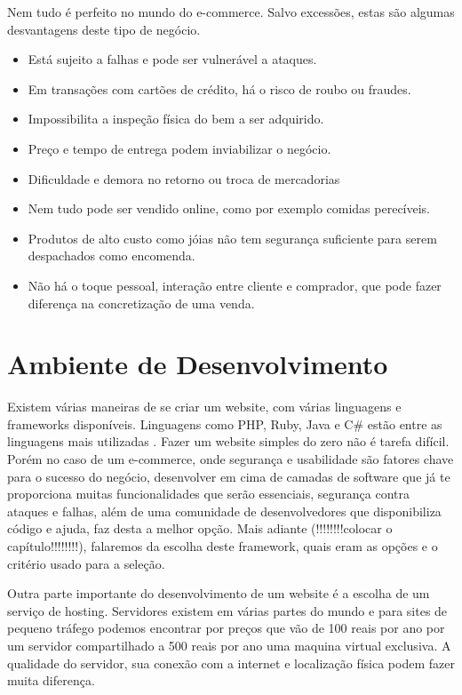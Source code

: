 Nem tudo é perfeito no mundo do e-commerce. Salvo excessões, estas são algumas desvantagens deste tipo de negócio.

\begin{itemize}
  \item Está sujeito a falhas e pode ser vulnerável a ataques.
  \item Em transações com cartões de crédito, há o risco de roubo ou fraudes.
  \item Impossibilita a inspeção física do bem a ser adquirido.
  \item Preço e tempo de entrega podem inviabilizar o negócio.
  \item Dificuldade e demora no retorno ou troca de mercadorias
  \item Nem tudo pode ser vendido online, como por exemplo comidas perecíveis.
  \item Produtos de alto custo como jóias não tem segurança suficiente para serem despachados como encomenda.
  \item Não há o toque pessoal, interação entre cliente e comprador, que pode fazer diferença na concretização de uma venda.
\end{itemize}


\section{Ambiente de Desenvolvimento}

Existem várias maneiras de se criar um website, com várias linguagens e frameworks disponíveis. Linguagens como PHP, Ruby, Java e C# estão entre as linguagens mais utilizadas \cite{UsageStatistics}. Fazer um website simples do zero não é tarefa difícil. Porém no caso de um e-commerce, onde segurança e usabilidade são fatores chave para o sucesso do negócio, desenvolver em cima de camadas de software que já te proporciona muitas funcionalidades que serão essenciais, segurança contra ataques e falhas, além de uma comunidade de desenvolvedores que disponibiliza código e ajuda, faz desta a melhor opção. Mais adiante (!!!!!!!!colocar o capítulo!!!!!!!!), falaremos da escolha deste framework, quais eram as opções e o critério usado para a seleção.

Outra parte importante do desenvolvimento de um website é a escolha de um serviço de hosting. Servidores existem em várias partes do mundo e para sites de pequeno tráfego podemos encontrar por preços que vão de 100 reais por ano por um servidor compartilhado a 500 reais por ano uma maquina virtual exclusiva. A qualidade do servidor, sua conexão com a internet e localização física podem fazer muita diferença.

